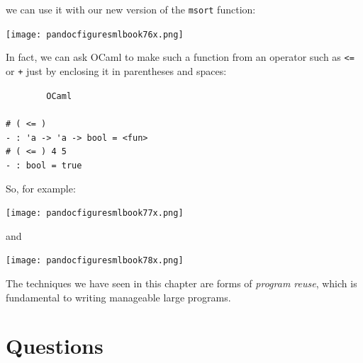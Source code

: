 \documentclass[]{book}
\newcommand{\smspace}{\vspace{4mm}}
\begin{document}
\noindent we can use it with our new version of the \texttt{msort} function:

\medskip
\begin{center}
\noindent\texttt{[image: pandocfiguresmlbook76x.png]}
\end{center}
\medskip

\noindent In fact, we can ask OCaml to make such a function from an operator such as \texttt{<=} or \texttt{+} just by enclosing it in parentheses and spaces:

\smspace
\noindent\verb!        OCaml!\\
\noindent\\
\noindent\verb!# ( <= )!\\
\noindent\verb!- : 'a -> 'a -> bool = <fun>!\\
\noindent\verb!# ( <= ) 4 5!\\
\noindent\verb!- : bool = true!
\smspace

\noindent So, for example:

\medskip
\begin{center}
\noindent\texttt{[image: pandocfiguresmlbook77x.png]}
\end{center}
\medskip

\noindent and

\medskip
\begin{center}
\noindent\texttt{[image: pandocfiguresmlbook78x.png]}
\end{center}
\medskip

\noindent The techniques we have seen in this chapter are forms of \textit{program reuse}, which is fundamental to writing manageable large programs.

\clearpage
\section*{Questions}
\end{document}
